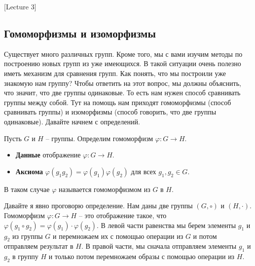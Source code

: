 [Lecture 3]


\subsection{Гомоморфизмы и изоморфизмы}

Существует много различных групп.
Кроме того, мы с вами изучим методы по построению новых групп из уже имеющихся.
В такой ситуации очень полезно иметь механизм для сравнения групп.
Как понять, что мы построили уже знакомую нам группу?
Чтобы ответить на этот вопрос, мы должны объяснить, что значит, что две группы одинаковые.
То есть нам нужен способ сравнивать группы между собой.
Тут на помощь нам приходят гомоморфизмы (способ сравнивать группы) и изоморфизмы (способ говорить, что две группы одинаковые).
Давайте начнем с определений.

\begin{definition}
Пусть $G$ и $H$ -- группы.
Определим гомоморфизм $\varphi\colon G\to H$.
\begin{itemize}
\item \textbf{Данные} отображение $\varphi\colon G\to H$.

\item \textbf{Аксиома} $\varphi(g_1g_2) = \varphi(g_1) \varphi(g_2)$ для всех $g_1,g_2\in G$.
\end{itemize}
В таком случае $\varphi$ называется гомоморфизмом из $G$ в $H$.
\end{definition}

\begin{remark}
Давайте я явно проговорю определение.
Нам даны две группы $(G, \circ)$ и $(H,\cdot)$.
Гомоморфизм $\varphi \colon G\to H$ -- это отображение такое, что $\varphi(g_1 \circ g_2) = \varphi(g_1) \cdot \varphi(g_2)$.
В левой части равенства мы берем элементы $g_1$ и $g_2$ из группы $G$ и перемножаем их с помощью операции из $G$ и потом отправляем результат в $H$.
В правой части, мы сначала отправляем элементы $g_1$ и $g_2$ в группу $H$ и только потом перемножаем образы с помощью операции из $H$.
\end{remark}

